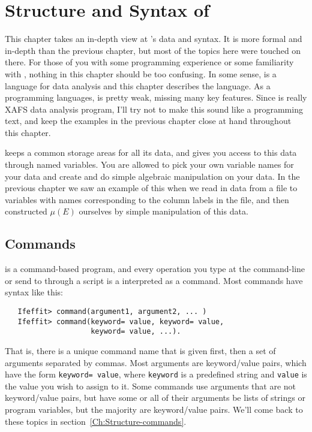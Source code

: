 \section{Structure and Syntax of {\ifeffit}} \label{Ch:Structure}

This chapter takes an in-depth view at {\ifeffit}'s data and syntax.  It is
more formal and in-depth than the previous chapter, but most of the topics
here were touched on there.  For those of you with some programming
experience or some familiarity with {\feffit}, nothing in this chapter
should be too confusing.  In some sense, {\ifeffit} is a language for data
analysis and this chapter describes the {\ifeffit} language.  As a
programming languages, {\ifeffit} is pretty weak, missing many key
features.  Since {\ifeffit} is really XAFS data analysis program, I'll try
not to make this sound like a programming text, and keep the examples in
the previous chapter close at hand throughout this chapter.

{\ifeffit} keeps a common storage areas for all its data, and gives
you access to this data through named variables.  You are allowed to
pick your own variable names for your data and create and do simple
algebraic manipulation on your data.  In the previous chapter we saw
an example of this when we read in data from a file to variables with
names corresponding to the column labels in the file, and then
constructed $\mu(E)$ ourselves by simple manipulation of this data.

\subsection{Commands} \label{Ch:Structure-cmnd}

{\ifeffit} is a command-based program, and every operation you type at the
command-line or send to {\ifeffit} through a script is a interpreted as a
command.  Most {\ifeffit} commands have syntax like this:
\begin{verbatim}
   Ifeffit> command(argument1, argument2, ... )
   Ifeffit> command(keyword= value, keyword= value, 
                    keyword= value, ...).
\end{verbatim}
\noindent
That is, there is a unique command name that is given first, then a set of
arguments separated by commas.  Most arguments are keyword/value pairs,
which have the form {\tt{keyword= value}}, where {\tt{keyword}} is a
predefined string and {\tt{value}} is the value you wish to assign to it.
Some commands use arguments that are not keyword/value pairs, but have some
or all of their arguments be lists of strings or program variables, but the
majority are keyword/value pairs.  We'll come back to these topics in
section~\ref{Ch:Structure-commands}.

